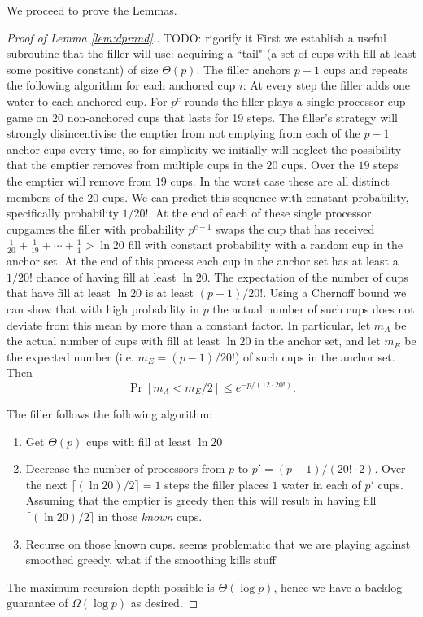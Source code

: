 \documentclass{article}[11pt]
\begin{document}
We proceed to prove the Lemmas. 

\begin{proof}[Proof of Lemma \ref{lem:dprand}.]
  {\color{red} TODO: rigorify it}
  First we establish a useful subroutine that the filler will use: acquiring a
  ``tail" (a set of cups with fill at least some positive constant) of size
  $\Theta(p)$.
  The filler anchors $p-1$ cups and repeats the following algorithm for each anchored cup $i$:
  At every step the filler adds one water to each anchored cup. For $p^c$
  rounds the filler plays a single processor cup game on $20$ non-anchored cups
  that lasts for 19 steps. The filler's strategy will strongly disincentivise
  the emptier from not emptying from each of the $p-1$ anchor cups every time,
  so for simplicity we initially will neglect the possibility that the emptier
  removes from multiple cups in the $20$ cups. Over the $19$ steps the emptier
  will remove from $19$ cups. In the worst case these are all distinct members
  of the $20$ cups. We can predict this sequence with constant probability,
  specifically probability $1/20!$. At the end of each of these single
  processor cupgames the filler with probability $p^{c-1}$
  swaps the cup that has received $\frac{1}{20} + \frac{1}{19} + \cdots +
  \frac{1}{1} > \ln 20$ fill with constant probability with a random cup in the
  anchor set.  At the end of this process each cup in the anchor set has at
  least a $1/20!$ chance of having fill at least $\ln 20.$ The expectation of
  the number of cups that have fill at least $\ln 20$ is at least $(p-1)/20!$. 
  Using a Chernoff bound we can show that with high probability in $p$ the actual
  number of such cups does not deviate from this mean by more than a constant
  factor. In particular, let $m_A$ be the actual number of cups with fill at
  least $\ln 20$ in the anchor set, and let $m_E$ be the expected number (i.e.
  $m_E = (p-1)/20!$) of such cups in the anchor set. Then $$\Pr[m_A < m_E /2 ]
  \le e^{-p / (12\cdot 20!)}.$$

  The filler follows the following algorithm:
  \begin{enumerate}
    \item Get $\Theta(p)$ cups with fill at least $\ln 20$ 
    \item Decrease the number of processors from $p$ to $p' = (p-1)/(20!\cdot 2)$.
      Over the next $\lceil (\ln 20)/2 \rceil = 1$ steps the filler places $1$
      water in each of $p'$ cups. Assuming that the emptier is greedy then this
      will result in having fill $\lceil (\ln 20) /2 \rceil$ in those \emph{known} cups.
    \item Recurse on those known cups. {\color{red} seems problematic that we are playing against smoothed greedy, what if the smoothing kills stuff}
  \end{enumerate}
  The maximum recursion depth possible is $\Theta(\log p)$, hence we have a backlog guarantee of $\Omega(\log p)$
  as desired.
\end{proof}
\end{document}
